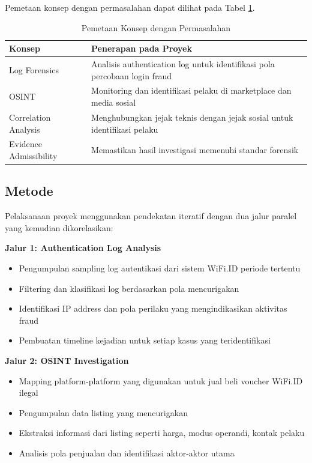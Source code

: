 \documentclass{ittelkom_ppi}
\begin{document}
Pemetaan konsep dengan permasalahan dapat dilihat pada Tabel \ref{tab:konsep}.

\begin{table}[h!]
\caption{Pemetaan Konsep dengan Permasalahan \label{tab:konsep}}
\begin{tabularx}{\linewidth}{|l|X|}
\hline
\textbf{Konsep} & \textbf{Penerapan pada Proyek} \\
\hline
Log Forensics & Analisis authentication log untuk identifikasi pola percobaan login fraud \\
\hline
OSINT & Monitoring dan identifikasi pelaku di marketplace dan media sosial \\
\hline
Correlation Analysis & Menghubungkan jejak teknis dengan jejak sosial untuk identifikasi pelaku \\
\hline
Evidence Admissibility & Memastikan hasil investigasi memenuhi standar forensik \\
\hline
\end{tabularx}
\end{table}


\subsection{Metode}
\justifying

Pelaksanaan proyek menggunakan pendekatan iteratif dengan dua jalur paralel yang kemudian dikorelasikan:

\textbf{Jalur 1: Authentication Log Analysis}
\begin{itemize}
    \item Pengumpulan sampling log autentikasi dari sistem WiFi.ID periode tertentu
    \item Filtering dan klasifikasi log berdasarkan pola mencurigakan
    \item Identifikasi IP address dan pola perilaku yang mengindikasikan aktivitas fraud
    \item Pembuatan timeline kejadian untuk setiap kasus yang teridentifikasi
\end{itemize}

\textbf{Jalur 2: OSINT Investigation}
\begin{itemize}
    \item Mapping platform-platform yang digunakan untuk jual beli voucher WiFi.ID ilegal
    \item Pengumpulan data listing yang mencurigakan
    \item Ekstraksi informasi dari listing seperti harga, modus operandi, kontak pelaku
    \item Analisis pola penjualan dan identifikasi aktor-aktor utama
\end{itemize}
\end{document}
